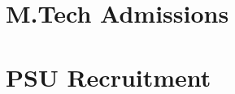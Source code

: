 \documentclass[12pt, twoside, openright]{book}
\begin{document}
\frontmatter





{
  \hypersetup{linkcolor=pfBlue}     %
  \tableofcontents
  \clearpage
}

\mainmatter

\part{M.Tech Admissions}










\part{PSU Recruitment}




\appendix
\renewcommand{\chaptermark}[1]{\markboth{Appendix \thechapter: #1}{}}




%
%
\end{document}
